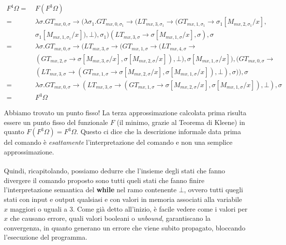     \begin{align*}
        F^4\Omega =\;& F(F^3\Omega)\\
        =\;& \lambda\sigma. GT_{mx,0,\sigma} \rightarrow (\lambda\sigma_1. GT_{mx,0,\sigma_1} \rightarrow (LT_{mx,3,\sigma_1}\rightarrow (GT_{mx,1,\sigma_1} \rightarrow \sigma_1[M_{mx,2,\sigma_1}/x],\\
        &\sigma_1[M_{mx,1,\sigma_1}/x]), \bot), \sigma_1)(LT_{mx,3,\sigma}\rightarrow \sigma[M_{mx,1,\sigma}/x], \sigma), \sigma\\
        =\;& \lambda\sigma. GT_{mx,0,\sigma} \rightarrow (LT_{mx,3,\sigma}\rightarrow (GT_{mx,1,\sigma} \rightarrow (LT_{mx,4,\sigma}\rightarrow\\
        &(GT_{mx,2,\sigma} \rightarrow \sigma[M_{mx,3,\sigma}/x],\sigma[M_{mx,2,\sigma}/x]), \bot), \sigma[M_{mx,1,\sigma}/x]),(GT_{mx,0,\sigma} \rightarrow\\
        &(LT_{mx,3,\sigma}\rightarrow (GT_{mx,1,\sigma} \rightarrow \sigma[M_{mx,2,\sigma}/x],\sigma[M_{mx,1,\sigma}/x]), \bot), \sigma)), \sigma\\
        =\;& \lambda\sigma. GT_{mx,0,\sigma} \rightarrow (LT_{mx,3,\sigma}\rightarrow (GT_{mx,1,\sigma} \rightarrow \sigma[M_{mx,2,\sigma}/x], \sigma[M_{mx,1,\sigma}/x]), \bot), \sigma\\
        =\;& F^3\Omega
    \end{align*}
    
    Abbiamo trovato un punto fisso! La terza approssimazione calcolata prima risulta essere un punto fisso del funzionale $F$ (il minimo, grazie al Teorema di Kleene) in quanto $F(F^3\Omega)=F^3\Omega$. Questo ci dice che la descrizione informale data prima del comando è \textit{esattamente} l'interpretazione del comando e non una semplice approssimazione.\\
    \\
    Quindi, ricapitolando, possiamo dedurre che l'insieme degli stati che fanno divergere il comando proposto sono tutti queli stati che fanno finire l'interpretazione semantica del \textbf{while} nel ramo contenente $\bot$, ovvero tutti quegli stati con input e output qualsiasi e con valori in memoria associati alla variabile $x$ maggiori o uguali a $3$. Come già detto all'inizio, è facile vedere come i valori per $x$ che causano errore, quali valori booleani o \textit{unbound}, garantiscano la convergenza, in quanto generano un errore che viene subito propagato, bloccando l'esecuzione del programma.
